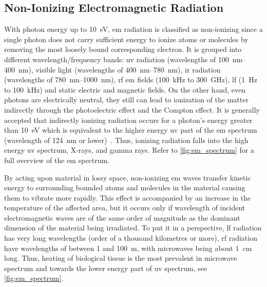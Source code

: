 \subsection{Non-Ionizing Electromagnetic Radiation}
With photon energy up to \SI{10}{\eV}, \gls{em} radiation is classified as non-ionizing since a single photon does not carry sufficient energy to ionize atoms or molecules by removing the most loosely bound corresponding electron.
It is grouped into different wavelength/frequency bands: \gls{uv} radiation (wavelengths of \SIrange[range-units=single,range-phrase=--]{100}{400}{\nm}), visible light (wavelengths of \SIrange[range-units=single,range-phrase=--]{400}{780}{\nm}), \gls{ir} radiation (wavelengths of \SIrange[range-units=single,range-phrase=--]{780}{1000}{\nm}), \gls{rf} \gls{em} fields (\SI{100}{\kHz} to \SI{300}{\GHz}), \gls{lf} (\SI{1}{\Hz} to \SI{100}{\kHz}) and static electric and magnetic fields.
On the other hand, even photons are electrically neutral, they still can lead to ionization of the matter indirectly through the photoelectric effect and the Compton effect.
It is generally accepted that indirectly ionizing radiation occurs for a photon's energy greater than \SI{10}{\eV} which is equivalent to the higher energy \gls{uv} part of the \gls{em} spectrum (wavelength of \SI{124}{\nm} or lower)~\cite{arpansa2022ionizing,Bulletin1999QuestionsAA}.
Thus, ionizing radiation falls into the high energy \gls{uv} spectrum, X-rays, and gamma rays.
Refer to \cref{fig:em_spectrum} for a full overview of the \gls{em} spectrum.


By acting upon material in lossy space, non-ionizing \gls{em} waves transfer kinetic energy to surrounding bounded atoms and molecules in the material causing them to vibrate more rapidly.
This effect is accompanied by an increase in the temperature of the affected area, but it occurs only if wavelength of incident electromagnetic waves are of the same order of magnitude as the dominant dimension of the material being irradiated.
To put it in a perspective, \gls{lf} radiation has very long wavelengths (order of a thousand kilometres or more), \gls{rf} radiation have wavelengths of between \SI{1}{} and \SI{100}{\m}, with microwaves being about \SI{1}{\cm} long.
Thus, heating of biological tissue is the most prevalent in microwave spectrum and towards the lower energy part of \gls{uv} spectrum, see \cref{fig:em_spectrum}.

